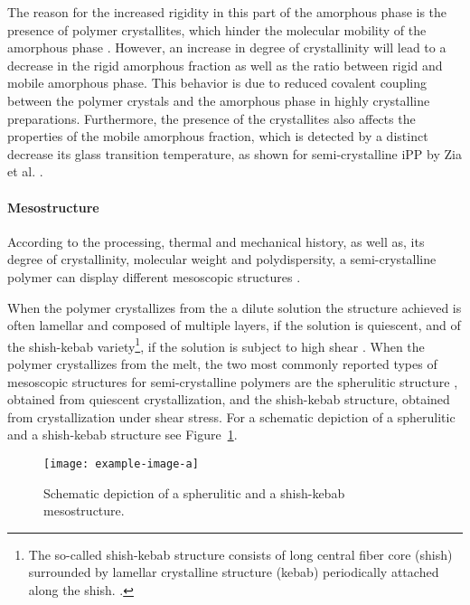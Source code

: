 The reason for the increased rigidity in this part of the amorphous phase is the presence of polymer crystallites, which hinder the molecular mobility of the amorphous phase \citep{ziaRigidAmorphousFraction2008, peacockHandbookPolyethyleneStructures2014}.
However, an increase in degree of crystallinity will lead to a decrease in the rigid amorphous fraction as well as the ratio between rigid and mobile amorphous phase.
This behavior is due to reduced covalent coupling between the polymer crystals and the amorphous phase in highly crystalline preparations\citep{ziaRigidAmorphousFraction2008}.
Furthermore, the presence of the crystallites also affects the properties of the mobile amorphous fraction, which is detected by a distinct decrease its glass transition temperature, as shown for semi-crystalline iPP by Zia et al. \citep{ziaRigidAmorphousFraction2008}.

\paragraph{Mesostructure}
According to the processing, thermal and mechanical history, as well as, its degree of crystallinity, molecular weight and polydispersity, a semi-crystalline polymer can display different mesoscopic structures \citep{cangemiTwoPhaseModelMechanical2001, mandelkernCrystallinePolymerReminiscences2006}.

When the polymer crystallizes from the a dilute solution the structure achieved is often lamellar and composed of multiple layers, if the solution is quiescent, and of the shish-kebab variety\footnote{The so-called shish-kebab structure consists of long central fiber core (shish) surrounded by lamellar crystalline structure (kebab) periodically attached along the shish.
\citep{naViscousForceDominatedTensileDeformation2006, peacockHandbookPolyethyleneStructures2014}.}, if the solution is subject to high shear \citep{khouryMorphologyCrystallineSynthetic1976, callister2014materials, peacockHandbookPolyethyleneStructures2014}.
When the polymer crystallizes from the melt, the two most commonly reported types of mesoscopic structures for semi-crystalline polymers are the spherulitic structure \citep{zengConstitutiveModelSemicrystalline2010}, obtained from quiescent crystallization, and the shish-kebab structure, obtained from crystallization under shear stress.
For a schematic depiction of a spherulitic and a shish-kebab structure see Figure~\ref{fig:mesostructure_scp}.
\begin{figure}[hbtp]
	\texttt{[image: example-image-a]}
	\caption{Schematic depiction of a spherulitic and a shish-kebab mesostructure.}
\label{fig:mesostructure_scp}
\end{figure}

